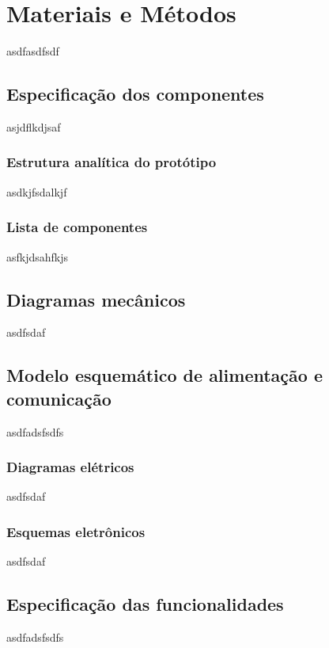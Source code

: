 \chapter{Materiais e Métodos}
\label{chap:mat}
asdfasdfsdf

\section{Especificação dos componentes}
\label{sec:espc}
asjdflkdjsaf

\subsection{Estrutura analítica do protótipo}
\label{ssec:pbs}
asdkjfsdalkjf

\subsection{Lista de componentes}
\label{ssec:list}
asfkjdsahfkjs


\section{Diagramas mecânicos}
\label{sec:diagm}
asdfsdaf

\section{Modelo esquemático de alimentação e comunicação}
\label{sec:modesq}
asdfadsfsdfs

\subsection{Diagramas elétricos}
\label{sec:diage}
asdfsdaf

\subsection{Esquemas eletrônicos}
\label{ssec:esqe}
asdfsdaf

\section{Especificação das funcionalidades}
\label{sec:espf}
asdfadsfsdfs

